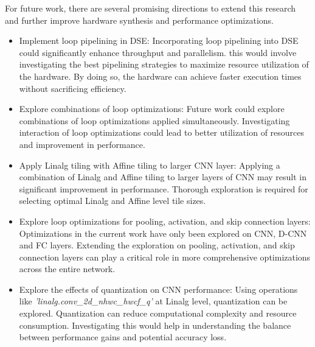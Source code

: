 For future work, there are several promising directions to extend this research and further improve hardware synthesis and performance optimizations.

\begin{itemize}
    \item Implement loop pipelining in DSE: Incorporating loop pipelining into DSE could significantly enhance throughput and parallelism. this would involve investigating the best pipelining strategies to maximize resource utilization of the hardware. By doing so, the hardware can achieve faster execution times without sacrificing efficiency.
    \item Explore combinations of loop optimizations: Future work could explore combinations of loop optimizations applied simultaneously. Investigating interaction of loop optimizations could lead to better utilization of resources and improvement in performance.
    \item Apply Linalg tiling with Affine tiling to larger CNN layer: Applying a combination of Linalg and Affine tiling to larger layers of CNN may result in significant improvement in performance. Thorough exploration is required for selecting optimal Linalg and Affine
    level tile sizes. 
    \item Explore loop optimizations for pooling, activation, and skip connection layers: Optimizations in the current work have only been explored on CNN, D-CNN and FC layers. Extending the exploration on pooling, activation, and skip connection layers can play a critical role in more comprehensive optimizations across the entire network.
    \item Explore the effects of quantization on CNN performance: Using operations like \textit{'linalg.conv\_2d\_nhwc\_hwcf\_q'} at Linalg level, quantization can be explored. Quantization can reduce computational complexity and resource consumption. Investigating this would help in understanding the balance between performance gains and potential accuracy loss. 
\end{itemize}